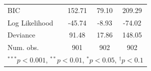 \documentclass[12pt,]{book}
\let\origtable\table
\let\endorigtable\endtable
\renewenvironment{table}[1][2] {
    \singlespacing
    \expandafter\origtable\expandafter[H]
} {
    \endorigtable
}
\theoremstyle{definition}
\theoremstyle{definition}
\theoremstyle{definition}
\theoremstyle{remark}
\begin{document}
\begin{table}
\begin{center}
\begin{tabular}{l c c c }
BIC                               & 152.71      & 79.10     & 209.29      \\
Log Likelihood                    & -45.74      & -8.93     & -74.02      \\
Deviance                          & 91.48       & 17.86     & 148.05      \\
Num. obs.                         & 901         & 902       & 902         \\
\hline
\multicolumn{4}{l}{\scriptsize{$^{***}p<0.001$, $^{**}p<0.01$, $^*p<0.05$, $^{\dagger}p<0.1$}}
\end{tabular}
\caption{Rare Events Logit Models of Alliance Formation (Conflict-Years with < 1000 Fatalities Only)}
\label{tab:alliance-conflict}
\end{center}
\end{table}
\end{document}
